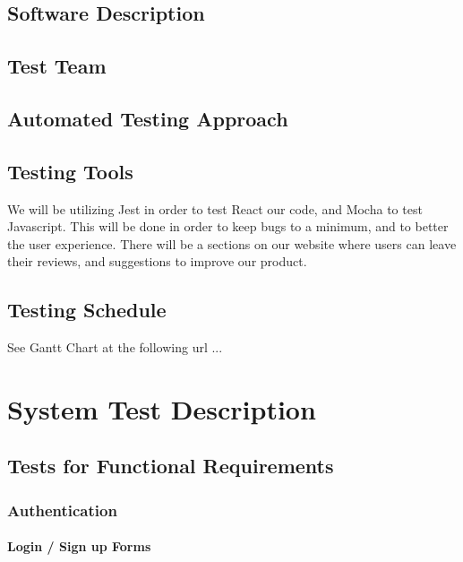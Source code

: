 \documentclass[12pt, titlepage]{article}
\begin{document}
\subsection{Software Description}

\subsection{Test Team}

\subsection{Automated Testing Approach}

\subsection{Testing Tools}
We will be utilizing Jest in order to test React our code, and Mocha to test Javascript. This will be done in order to keep bugs to a minimum, and to better the user experience. There will be a sections on our website where users can leave their reviews, and suggestions to improve our product. 

\subsection{Testing Schedule}
		
See Gantt Chart at the following url ...

\section{System Test Description}
	
\subsection{Tests for Functional Requirements}

\subsubsection{Authentication}
		
\paragraph{Login / Sign up Forms}
\end{document}
